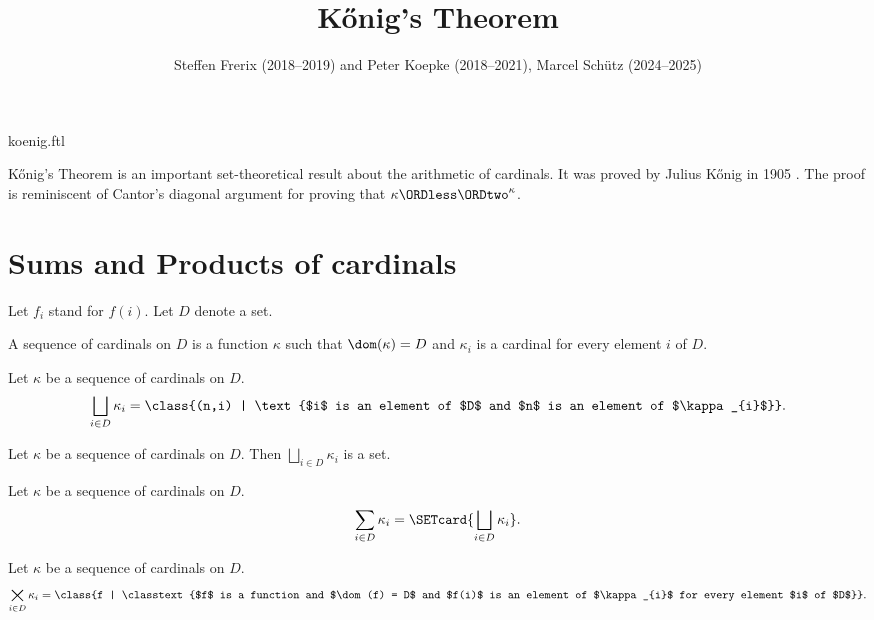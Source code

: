 \documentclass{article}
\title{Kőnig's Theorem}
\author{Steffen Frerix (2018--2019) and Peter Koepke (2018--2021), Marcel Schütz (2024--2025)}
\date{}
\newcommand{\SumSet}[2]{\bigsqcup_{i \in #2} #1_{i}}
\newcommand{\Sum}[2]{\sum_{i \in #2} #1_{i}}
\newcommand{\ProdSet}[2]{\bigtimes_{i \in #2} #1_{i}}
\begin{document}
\begin{smodule}{koenig.ftl}
\maketitle


\noindent Kőnig's Theorem is an important set-theoretical result about the
arithmetic of cardinals.
It was proved by Julius Kőnig in 1905 \cite[p. 177--180]{Koenig1905}.
The proof is reminiscent of Cantor's diagonal argument for proving that
$\kappa \ORDless \ORDtwo^\kappa$.


\section*{Sums and Products of cardinals}

\begin{forthel}
  Let $f_{i}$ stand for $f(i)$.
  Let $D$ denote a set.

  \begin{definition*}
    A sequence of cardinals on $D$ is a function $\kappa$ such that
    $\dom(\kappa) = D$ and $\kappa_{i}$ is a cardinal for every element $i$ of $D$.
  \end{definition*}

  \begin{definition*}
    Let $\kappa$ be a sequence of cardinals on $D$.
    \[ \SumSet{\kappa}{D} = \class{(n,i) | \text{$i$ is an element of $D$ and $n$ is an element of $\kappa_{i}$}}. \]
  \end{definition*}

  \begin{axiom*}
    Let $\kappa$ be a sequence of cardinals on $D$.
    Then $\SumSet{\kappa}{D}$ is a set.
  \end{axiom*}

  \begin{definition*}
    Let $\kappa$ be a sequence of cardinals on $D$.
    \[ \Sum{\kappa}{D} = \SETcard{ \SumSet{\kappa}{D} }. \]
  \end{definition*}

  \begin{definition*}
    Let $\kappa$ be a sequence of cardinals on $D$.
    \[ \ProdSet{\kappa}{D} = \class{f | \classtext{$f$ is a function and $\dom(f) = D$ and $f(i)$ is an element of $\kappa_{i}$ for every element $i$ of $D$}}. \]
  \end{definition*}


\end{forthel}
\end{smodule}
\end{document}
